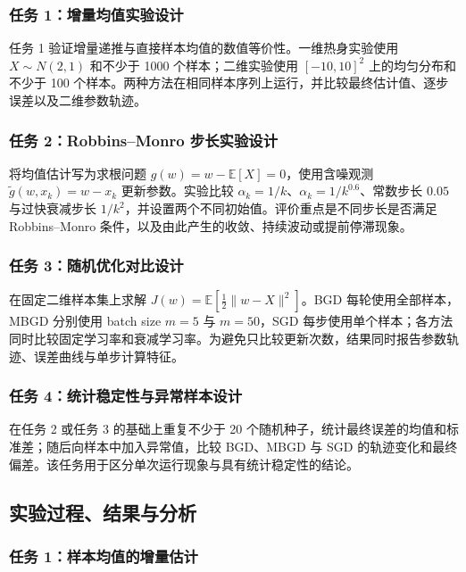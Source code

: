 \documentclass[11pt,a4paper,UTF8]{ctexart}
\numberwithin{figure}{section}
\numberwithin{table}{section}
\begin{document}
\subsubsection{任务 1：增量均值实验设计}

任务 1 验证增量递推与直接样本均值的数值等价性。一维热身实验使用 $X\sim N(2,1)$ 和不少于 1000 个样本；二维实验使用 $[-10,10]^2$ 上的均匀分布和不少于 100 个样本。两种方法在相同样本序列上运行，并比较最终估计值、逐步误差以及二维参数轨迹。

\subsubsection{任务 2：Robbins--Monro 步长实验设计}

将均值估计写为求根问题 $g(w)=w-\mathbb{E}[X]=0$，使用含噪观测 $\widetilde g(w,x_k)=w-x_k$ 更新参数。实验比较 $\alpha_k=1/k$、$\alpha_k=1/k^{0.6}$、常数步长 $0.05$ 与过快衰减步长 $1/k^2$，并设置两个不同初始值。评价重点是不同步长是否满足 Robbins--Monro 条件，以及由此产生的收敛、持续波动或提前停滞现象。

\subsubsection{任务 3：随机优化对比设计}

在固定二维样本集上求解 $J(w)=\mathbb{E}[\frac12\lVert w-X\rVert^2]$。BGD 每轮使用全部样本，MBGD 分别使用 batch size $m=5$ 与 $m=50$，SGD 每步使用单个样本；各方法同时比较固定学习率和衰减学习率。为避免只比较更新次数，结果同时报告参数轨迹、误差曲线与单步计算特征。

\subsubsection{任务 4：统计稳定性与异常样本设计}

在任务 2 或任务 3 的基础上重复不少于 20 个随机种子，统计最终误差的均值和标准差；随后向样本中加入异常值，比较 BGD、MBGD 与 SGD 的轨迹变化和最终偏差。该任务用于区分单次运行现象与具有统计稳定性的结论。




\subsection{实验过程、结果与分析}

\subsubsection{任务 1：样本均值的增量估计}
\end{document}
